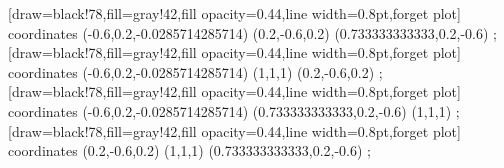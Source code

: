 [draw=black!78,fill=gray!42,fill opacity=0.44,line width=0.8pt,forget plot] coordinates {
  (-0.6,0.2,-0.0285714285714)
  (0.2,-0.6,0.2)
  (0.733333333333,0.2,-0.6)
} \closedcycle;
[draw=black!78,fill=gray!42,fill opacity=0.44,line width=0.8pt,forget plot] coordinates {
  (-0.6,0.2,-0.0285714285714)
  (1,1,1)
  (0.2,-0.6,0.2)
} \closedcycle;
[draw=black!78,fill=gray!42,fill opacity=0.44,line width=0.8pt,forget plot] coordinates {
  (-0.6,0.2,-0.0285714285714)
  (0.733333333333,0.2,-0.6)
  (1,1,1)
} \closedcycle;
[draw=black!78,fill=gray!42,fill opacity=0.44,line width=0.8pt,forget plot] coordinates {
  (0.2,-0.6,0.2)
  (1,1,1)
  (0.733333333333,0.2,-0.6)
} \closedcycle;
